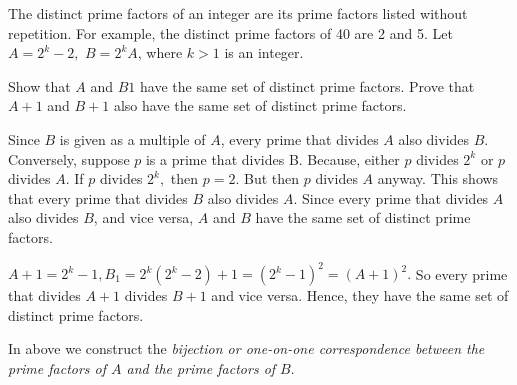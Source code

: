 \documentclass{article}
\begin{document}
\begin{example*}

    The distinct prime factors of an integer are its prime factors listed without repetition.
    For example, the distinct prime factors of 40 are 2 and 5.
    Let $A=2^k-2,$ $B=2^k A$, where $k >1$ is an integer.
    
    Show that $A$ and $B1$ have the same set of distinct prime factors.
    Prove that $A+1$ and $B+1$ also have the same set of distinct prime factors.
\end{example*}

\begin{soln}
    Since $B$ is given as a multiple of $A$, every prime that divides $A$ also divides $B.$
    Conversely, suppose $p$ is a prime that divides B. Because, either $p$ divides $2^k$ or $p$ divides $A.$
    If $p$ divides $2^k,$ then $p=2$. But then $p$ divides $A$ anyway.
    This shows that every prime that divides $B$ also divides $A.$
    Since every prime that divides $A$ also divides $B$, and vice versa, $A$ and $B$ have the same set of distinct prime factors. 

	$A+1 = 2^k-1, B_1=2^k(2^k-2)+1=(2^k-1)^2=(A+1)^2.$
    So every prime that divides $A+1$ divides $B+1$ and vice versa. Hence, they have the same set of distinct prime factors. 
 
    In above we construct the \textit{bijection or one-on-one correspondence between the prime factors of $A$ and the prime factors of $B.$} 
\end{soln}
\end{document}
